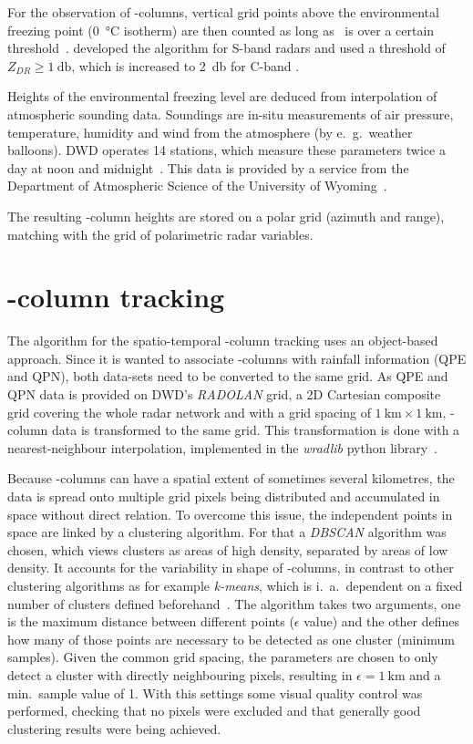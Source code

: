 For the observation of \zdr-columns, vertical grid points above the environmental freezing point (\SI{0}{\degreeCelsius} isotherm) are then counted as long as \zdr~is over a certain threshold~\cite{snyder}. \citeauthor{snyder} developed the algorithm for S-band radars and used a threshold of $Z_{DR} \geq \SI{1}{\decibel}$, which is increased to \SI{2}{\decibel} for C-band \cite[p. 70]{mari}.

Heights of the environmental freezing level are deduced from interpolation of atmospheric sounding data. Soundings are in-situ measurements of air pressure, temperature, humidity and wind from the atmosphere (by e.\ g.\ weather balloons). DWD operates 14 stations, which measure these parameters twice a day at noon and midnight~\cite{sounding_dwd}. This data is provided by a service from the Department of Atmospheric Science of the University of Wyoming~\cite{sounding}.

The resulting \zdr-column heights are stored on a polar grid (azimuth and range), matching with the grid of polarimetric radar variables.

\section{\zdr-column tracking}
\label{sec:tracker}
The algorithm for the spatio-temporal \zdr-column tracking uses an object-based approach.
Since it is wanted to associate \zdr-columns with rainfall information (QPE and QPN), both data-sets need to be converted to the same grid. As QPE and QPN data is provided on DWD's \emph{RADOLAN} grid, a 2D Cartesian composite grid covering the whole radar network and with a grid spacing of $\SI{1}{\kilo\metre} \times \SI{1}{\kilo\metre}$, \zdr-column data is transformed to the same grid. This transformation is done with a nearest-neighbour interpolation, implemented in the \emph{wradlib} python library~\cite{wradlib}.

Because \zdr-columns can have a spatial extent of sometimes several kilometres, the data is spread onto multiple grid pixels being distributed and accumulated in space without direct relation. To overcome this issue, the independent points in space are linked by a clustering algorithm. For that a \emph{DBSCAN} algorithm was chosen, which views clusters as areas of high density, separated by areas of low density. It accounts for the variability in shape of \zdr-columns, in contrast to other clustering algorithms as for example \emph{k-means}, which is i.\ a.\ dependent on a fixed number of clusters defined beforehand~\cite{dbscan}. The algorithm takes two arguments, one is the maximum distance between different points ($\epsilon$ value) and the other defines how many of those points are necessary to be detected as one cluster (minimum samples). Given the common grid spacing, the parameters are chosen to only detect a cluster with directly neighbouring pixels, resulting in $\epsilon = \SI{1}{\kilo\metre}$ and a min.\ sample value of 1. With this settings some visual quality control was performed, checking that no pixels were excluded and that generally good clustering results were being achieved.

